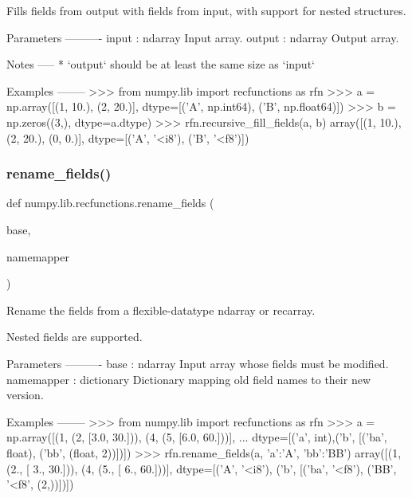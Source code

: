 \begin{DoxyVerb}Fills fields from output with fields from input,
with support for nested structures.

Parameters
----------
input : ndarray
    Input array.
output : ndarray
    Output array.

Notes
-----
* `output` should be at least the same size as `input`

Examples
--------
>>> from numpy.lib import recfunctions as rfn
>>> a = np.array([(1, 10.), (2, 20.)], dtype=[('A', np.int64), ('B', np.float64)])
>>> b = np.zeros((3,), dtype=a.dtype)
>>> rfn.recursive_fill_fields(a, b)
array([(1, 10.), (2, 20.), (0,  0.)], dtype=[('A', '<i8'), ('B', '<f8')])\end{DoxyVerb}
 \mbox{\label{namespacenumpy_1_1lib_1_1recfunctions_a5a5dc203d0562d6eccd70e7230bb9c6e}} 
\subsubsection{\texorpdfstring{rename\+\_\+fields()}{rename\_fields()}}
{\footnotesize\ttfamily def numpy.\+lib.\+recfunctions.\+rename\+\_\+fields (\begin{DoxyParamCaption}\item[{}]{base,  }\item[{}]{namemapper }\end{DoxyParamCaption})}

\begin{DoxyVerb}Rename the fields from a flexible-datatype ndarray or recarray.

Nested fields are supported.

Parameters
----------
base : ndarray
    Input array whose fields must be modified.
namemapper : dictionary
    Dictionary mapping old field names to their new version.

Examples
--------
>>> from numpy.lib import recfunctions as rfn
>>> a = np.array([(1, (2, [3.0, 30.])), (4, (5, [6.0, 60.]))],
...   dtype=[('a', int),('b', [('ba', float), ('bb', (float, 2))])])
>>> rfn.rename_fields(a, {'a':'A', 'bb':'BB'})
array([(1, (2., [ 3., 30.])), (4, (5., [ 6., 60.]))],
      dtype=[('A', '<i8'), ('b', [('ba', '<f8'), ('BB', '<f8', (2,))])])\end{DoxyVerb}
 \mbox{\label{namespacenumpy_1_1lib_1_1recfunctions_ab8fc8e3af3c0a7ef3802c6d38e529bf7}} 
